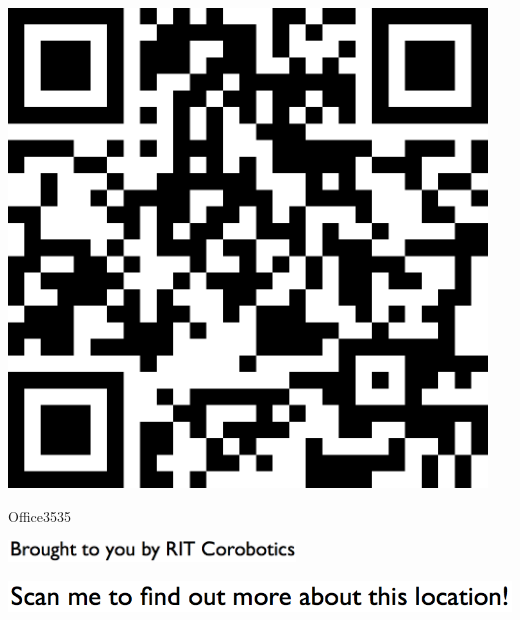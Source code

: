 \documentclass[letterpaper]{article}
\begin{document}
 \begingroup 
 \centerline{\includegraphics[scale=1,width=5in,height=5in]{Office3535.png}} 
 \endgroup 
 \vspace*{\fill} 

 \hfill{\small Office3535} 

  \vspace{0.7in} 
 
 \centerline{\includegraphics[scale=1,width=3in]{text-bottom.png}} 
 
 \pagebreak 
{} 
 \vspace*{\fill} 
 
  \centerline{\includegraphics[scale=1,width=6in]{text-top.png}} 
 
 \vspace{0.5in} 
 
\end{document}
